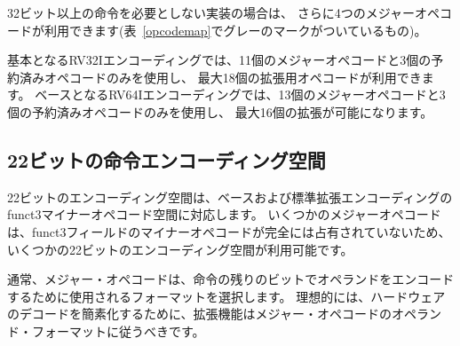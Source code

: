 \begin{comment}
If an implementation does not require instructions longer than
32-bits, then an additional four major opcodes are available (those
marked in gray in Table~\ref{opcodemap}).
\end{comment}
32ビット以上の命令を必要としない実装の場合は、
さらに4つのメジャーオペコードが利用できます(表~\ref{opcodemap}でグレーのマークがついているもの)。

\begin{comment}
The base RV32I encoding uses only 11 major opcodes plus 3 reserved
opcodes, leaving up to 18 available for extensions.  The base RV64I
encoding uses only 13 major opcodes plus 3 reserved opcodes, leaving
up to 16 available for extensions.
\end{comment}
基本となるRV32Iエンコーディングでは、11個のメジャーオペコードと3個の予約済みオペコードのみを使用し、
最大18個の拡張用オペコードが利用できます。
ベースとなるRV64Iエンコーディングでは、13個のメジャーオペコードと3個の予約済みオペコードのみを使用し、
最大16個の拡張が可能になります。

\begin{comment}
\subsection*{Available 22-bit instruction encoding spaces}
\end{comment}
\subsection*{22ビットの命令エンコーディング空間}

\begin{comment}
A 22-bit encoding space corresponds to a funct3 minor opcode space in
the base and standard extension encodings.  Several major opcodes have
a funct3 field minor opcode that is not completely occupied, leaving
available several 22-bit encoding spaces.
\end{comment}
22ビットのエンコーディング空間は、ベースおよび標準拡張エンコーディングのfunct3マイナーオペコード空間に対応します。
いくつかのメジャーオペコードは、funct3フィールドのマイナーオペコードが完全には占有されていないため、
いくつかの22ビットのエンコーディング空間が利用可能です。

\begin{comment}
Usually a major opcode selects the format used to encode operands in
the remaining bits of the instruction, and ideally, an extension
should follow the operand format of the major opcode to simplify
hardware decoding.
\end{comment}
通常、メジャー・オペコードは、命令の残りのビットでオペランドをエンコードするために使用されるフォーマットを選択します。
理想的には、ハードウェアのデコードを簡素化するために、拡張機能はメジャー・オペコードのオペランド・フォーマットに従うべきです。

